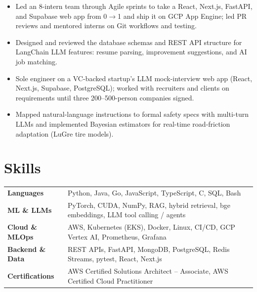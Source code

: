 \documentclass[11pt, letterpaper]{article}
\begin{document}
\begin{itemize}
  \item Led an 8-intern team through Agile sprints to take a React, Next.js, FastAPI, and Supabase web app from 0$\to$1 and ship it on GCP App Engine; led PR reviews and mentored interns on Git workflows and testing.
  \item Designed and reviewed the database schemas and REST API structure for LangChain LLM features: resume parsing, improvement suggestions, and AI job matching.
\end{itemize}

\begin{itemize}
  \item Sole engineer on a VC-backed startup's LLM mock-interview web app (React, Next.js, Supabase, PostgreSQL); worked with recruiters and clients on requirements until three 200--500-person companies signed.
\end{itemize}

\begin{itemize}
  \item Mapped natural-language instructions to formal safety specs with multi-turn LLMs and implemented Bayesian estimators for real-time road-friction adaptation (LuGre tire models).
\end{itemize}

\section{Skills}
\begin{tabularx}{\textwidth}{@{}l @{\hspace{7pt}} >{\raggedright\arraybackslash}X@{}}
  \textbf{Languages} & Python, Java, Go, JavaScript, TypeScript, C, SQL, Bash \\[1pt]
  \textbf{ML \& LLMs} & PyTorch, CUDA, NumPy, RAG, hybrid retrieval, bge embeddings, LLM tool calling / agents \\[1pt]
  \textbf{Cloud \& MLOps} & AWS, Kubernetes (EKS), Docker, Linux, CI/CD, GCP Vertex AI, Prometheus, Grafana \\[1pt]
  \textbf{Backend \& Data} & REST APIs, FastAPI, MongoDB, PostgreSQL, Redis Streams, pytest, React, Next.js \\[1pt]
  \textbf{Certifications} & AWS Certified Solutions Architect -- Associate, AWS Certified Cloud Practitioner \\
\end{tabularx}
\end{document}
